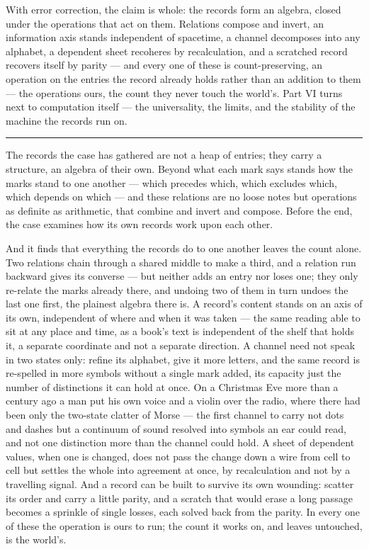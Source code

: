 \bigskip

With error correction, the claim is whole: the records form an algebra, closed under
the operations that act on them. Relations compose and invert, an information axis stands independent of
spacetime, a channel decomposes into any alphabet, a dependent sheet recoheres by recalculation, and a
scratched record recovers itself by parity --- and every one of these is count-preserving, an operation on the
entries the record already holds rather than an addition to them --- the operations ours, the count they never
touch the world's. Part VI turns next to computation itself ---
the universality, the limits, and the stability of the machine the records run on.

\bigskip
\begin{center}
\rule{0.4\textwidth}{0.4pt}
\end{center}
\bigskip

\noindent The records the case has gathered are not a heap of entries; they carry a structure, an algebra of
their own. Beyond what each mark says stands how the marks stand to one another --- which precedes which, which
excludes which, which depends on which --- and these relations are no loose notes but operations as definite as
arithmetic, that combine and invert and compose. Before the end, the case examines how its own records work upon
each other.

And it finds that everything the records do to one another leaves the count alone. Two relations chain through a
shared middle to make a third, and a relation run backward gives its converse --- but neither adds an entry nor
loses one; they only re-relate the marks already there, and undoing two of them in turn undoes the last one
first, the plainest algebra there is. A record's content stands on an axis of its own,
independent of where and when it was taken --- the same reading able to sit at any place and time, as a book's
text is independent of the shelf that holds it, a separate coordinate and not a separate direction. A channel
need not speak in two states only: refine its alphabet, give it more letters, and the same record is re-spelled
in more symbols without a single mark added, its capacity just the number of distinctions it can hold at once.
On a Christmas Eve more than a century ago a man put his own voice and a violin over the radio, where there had
been only the two-state clatter of Morse --- the first channel to carry not dots and dashes but a continuum of
sound resolved into symbols an ear could read, and not one distinction more than the channel could hold. A
sheet of dependent values, when one is changed, does not pass the change down a wire from cell to cell but
settles the whole into agreement at once, by recalculation and not by a travelling signal. And a record can be
built to survive its own wounding: scatter its order and carry a little parity, and a scratch that would erase a
long passage becomes a sprinkle of single losses, each solved back from the parity. In every one of these the
operation is ours to run; the count it works on, and leaves untouched, is the world's.

